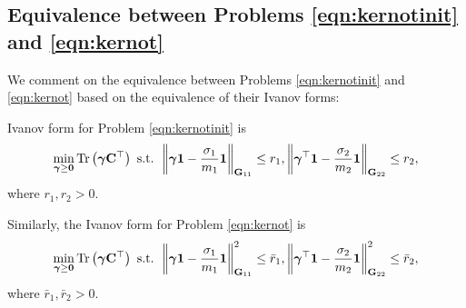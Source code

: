 
\subsection[Equivalence between our OT Formulations with MMD and squared-MMD Regularizations]{Equivalence between Problems \ref{eqn:kernotinit} and \ref{eqn:kernot}}\label{Ivanov}
We comment on the equivalence between Problems \ref{eqn:kernotinit} and \ref{eqn:kernot} based on the equivalence of their Ivanov forms:

Ivanov form for Problem \ref{eqn:kernotinit} is
\begin{equation*}
    \min\limits_{\bm{\gamma}\ge \mathbf{0}} \textup{Tr}\left( \bm{\gamma} \mathbf{C}^\top\right) \textup{ s.t. } \left\Vert\bm{\gamma}\mathbf{1}-\frac{\sigma_1}{m_1}\mathbf{1}\right\Vert_{\mathbf{G}_{11}}\leq r_1, \left\Vert\bm{\gamma}^\top\mathbf{1}-\frac{\sigma_2}{m_2}\mathbf{1}\right\Vert_{\mathbf{G}_{22}}\leq r_2, 
\end{equation*}
where $r_1, r_2>0$.

Similarly, the Ivanov form for Problem \ref{eqn:kernot} is
\begin{equation*}
    \min\limits_{\bm{\gamma}\ge \mathbf{0}} \textup{Tr}\left( \bm{\gamma} \mathbf{C}^\top\right) \textup{ s.t. } \left\Vert\bm{\gamma}\mathbf{1}-\frac{\sigma_1}{m_1}\mathbf{1}\right\Vert^2_{\mathbf{G}_{11}}\leq \bar{r}_1, \left\Vert\bm{\gamma}^\top\mathbf{1}-\frac{\sigma_2}{m_2}\mathbf{1}\right\Vert^2_{\mathbf{G}_{22}}\leq \bar{r}_2,
\end{equation*}
where $\bar{r}_1, \bar{r}_2>0$.

